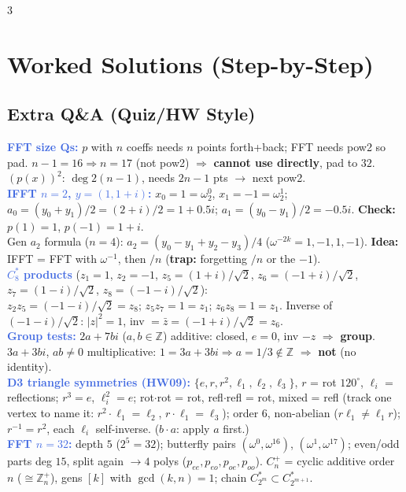 \documentclass[9pt]{extarticle}
\newcommand{\hl}[1]{\textbf{\textcolor{BrickRed}{#1}}}
\newcommand{\wk}[1]{\textbf{\textcolor{OliveGreen}{#1}}}
\newcommand{\ex}[1]{\textbf{\textcolor{RoyalBlue}{#1}}}
\begin{document}
\begin{multicols}{3}
\section{Worked Solutions (Step-by-Step)}
\subsection{Extra Q\&A (Quiz/HW Style)}
\begin{sloppypar}\raggedright
\ex{FFT size Qs:} $p$ with $n$ coeffs needs $n$ points forth+back; FFT needs pow2 so pad. $n{-}1{=}16\Rightarrow n{=}17$ (not pow2) $\Rightarrow$ \hl{cannot use directly}, pad to $32$. $(p(x))^2$: $\deg2(n{-}1)$, needs $2n{-}1$ pts $\to$ next pow2.\\
\ex{IFFT $n{=}2$, $y{=}(1,1{+}i)$:} $x_0{=}1{=}\omega_2^0$, $x_1{=}{-}1{=}\omega_2^1$; $a_0{=}(y_0{+}y_1)/2{=}(2{+}i)/2{=}1{+}0.5i$; $a_1{=}(y_0{-}y_1)/2{=}{-}0.5i$. \wk{Check:} $p(1){=}1$, $p({-}1){=}1{+}i$.\\
Gen $a_2$ formula ($n{=}4$): $a_2{=}(y_0{-}y_1{+}y_2{-}y_3)/4$ ($\omega^{-2k}{=}1,{-}1,1,{-}1$). \wk{Idea:} IFFT = FFT with $\omega^{-1}$, then $/n$ (\hl{trap:} forgetting $/n$ or the ${-}1$).\\
\ex{$C_8^*$ products} ($z_1{=}1$, $z_2{=}{-}1$, $z_5{=}(1{+}i)/\sqrt2$, $z_6{=}({-}1{+}i)/\sqrt2$, $z_7{=}(1{-}i)/\sqrt2$, $z_8{=}({-}1{-}i)/\sqrt2$):\\
$z_2z_5{=}({-}1{-}i)/\sqrt2{=}z_8$; $z_5z_7{=}1{=}z_1$; $z_6z_8{=}1{=}z_1$. Inverse of $({-}1{-}i)/\sqrt2$: $|z|^2{=}1$, inv ${=}\bar z{=}({-}1{+}i)/\sqrt2{=}z_6$.\\
\ex{Group tests:} $2a{+}7bi$ ($a,b{\in}\mathbb Z$) additive: closed, $e{=}0$, inv ${-}z$ $\Rightarrow$ \hl{group}. $3a{+}3bi$, $ab{\ne}0$ multiplicative: $1{=}3a{+}3bi\Rightarrow a{=}1/3{\notin}\mathbb Z$ $\Rightarrow$ \hl{not} (no identity).\\
\ex{D3 triangle symmetries (HW09):} $\{e,r,r^2,\ell_1,\ell_2,\ell_3\}$, $r$ = rot $120^{\circ}$, $\ell_i$ = reflections; $r^3{=}e$, $\ell_i^2{=}e$; rot${\cdot}$rot = rot, refl${\cdot}$refl = rot, mixed = refl (track one vertex to name it: $r^2{\cdot}\ell_1{=}\ell_2$, $r{\cdot}\ell_1{=}\ell_3$); order 6, non-abelian ($r\ell_1{\ne}\ell_1r$); $r^{-1}{=}r^2$, each $\ell_i$ self-inverse. ($b{\cdot}a$: apply $a$ first.)\\
\ex{FFT $n{=}32$:} depth $5$ ($2^5{=}32$); butterfly pairs $(\omega^0,\omega^{16})$, $(\omega^1,\omega^{17})$; even/odd parts deg $15$, split again $\to4$ polys ($p_{ee},p_{eo},p_{oe},p_{oo}$). $C_n^+$ = cyclic additive order $n$ (${\cong}\mathbb Z_n^+$), gens $[k]$ with $\gcd(k,n){=}1$; chain $C_{2^m}^*{\subset}C_{2^{m+1}}^*$.

\end{sloppypar}
\end{multicols}
\end{document}
